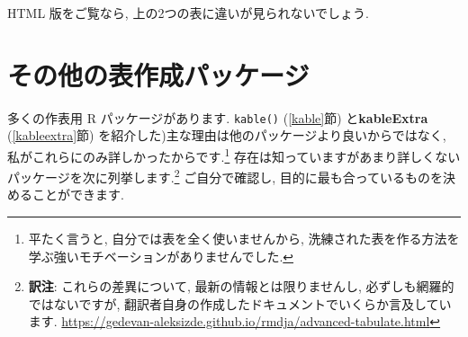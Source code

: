 \documentclass[
  11pt,
  lualatex,
  ja=standard]{bxjsreport}
\begin{document}
\begin{table}
\centering
{}
\end{table}

HTML 版をご覧なら, 上の2つの表に違いが見られないでしょう.

\hypertarget{table-other}{%
\section{その他の表作成パッケージ}\label{table-other}}

多くの作表用 R パッケージがあります. \texttt{kable()} (\ref{kable}節) と\textbf{kableExtra} (\ref{kableextra}節) を紹介した)主な理由は他のパッケージより良いからではなく, 私がこれらにのみ詳しかったからです.\footnote{平たく言うと, 自分では表を全く使いませんから, 洗練された表を作る方法を学ぶ強いモチベーションがありませんでした.} 存在は知っていますがあまり詳しくないパッケージを次に列挙します.\footnote{\textbf{訳注}: これらの差異について, 最新の情報とは限りませんし, 必ずしも網羅的ではないですが, 翻訳者自身の作成したドキュメントでいくらか言及しています. \url{https://gedevan-aleksizde.github.io/rmdja/advanced-tabulate.html}} ご自分で確認し, 目的に最も合っているものを決めることができます.
\end{document}
